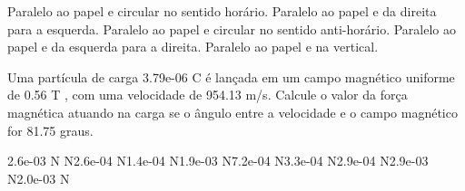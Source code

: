\documentclass[12pt, addpoints]{exam}
\begin{document}
\begin{questions}
\begin{multicols*}{2}
\begin{choices}
\choice Paralelo ao papel e circular no sentido horário. 
\choice Paralelo ao papel e da direita para a esquerda. 
\choice Paralelo ao papel e circular no sentido anti-horário. 
\choice Paralelo ao papel e da esquerda para a direita. 
\choice Paralelo ao papel e na vertical. 
\end{choices}
\question Uma partícula de carga 3.79e-06 C é lançada em um campo magnético uniforme de    0.56 T , com uma velocidade de 954.13 m/s. Calcule o valor da força magnética atuando na carga se o ângulo entre a velocidade e o campo magnético for   81.75 graus.

\begin{oneparchoices}
\choice 2.6e-03 N N\choice 2.6e-04 N\choice 1.4e-04 N\choice 1.9e-03 N\choice 7.2e-04 N\choice 3.3e-04 N\choice 2.9e-04 N\choice 2.9e-03 N\choice 2.0e-03 N
\end{oneparchoices}\end{multicols*}
\end{questions}
\newpage
\end{document}
